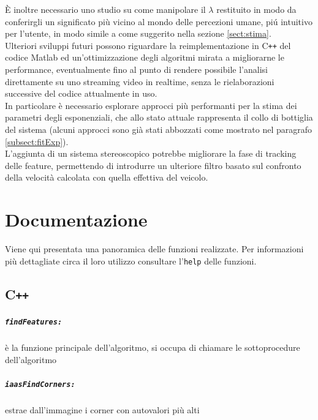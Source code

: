 \documentclass[12pt]{report}
\begin{document}
\noindent \`E inoltre necessario uno studio su come manipolare il $\lambda$ restituito in modo da conferirgli un significato pi\`u vicino al mondo delle percezioni umane, pi\'u intuitivo per l'utente, in modo simile a come suggerito nella sezione \ref{sect:stima}.\\

\noindent Ulteriori sviluppi futuri possono riguardare la reimplementazione in C\verb|++| del codice Matlab ed un'ottimizzazione degli algoritmi mirata a migliorarne le performance, eventualmente fino al punto di rendere possibile l'analisi direttamente su uno streaming video in realtime, senza le rielaborazioni successive del codice attualmente in uso. \\
In particolare \`e necessario esplorare approcci pi\`u performanti per la stima dei parametri degli esponenziali, che allo stato attuale rappresenta il collo di bottiglia del sistema (alcuni approcci sono gi\`a stati abbozzati come mostrato nel paragrafo \ref{subsect:fitExp}). \\

\noindent L'aggiunta di un sistema stereoscopico potrebbe migliorare la fase di tracking delle feature, permettendo di introdurre un ulteriore filtro basato sul confronto della velocit\`a calcolata con quella effettiva del veicolo.\\


\chapter{Documentazione}


Viene qui presentata una panoramica delle funzioni realizzate. Per informazioni pi\`u dettagliate circa il loro utilizzo consultare l'\verb|help| delle funzioni.

\section[C++]{C\verb_++_}

\paragraph*{\verb_findFeatures:_} \`e la funzione principale dell'algoritmo, si occupa di chiamare le sottoprocedure dell'algoritmo

\paragraph*{\verb_iaasFindCorners:_} estrae dall'immagine i corner con autovalori pi\`u alti
\end{document}
